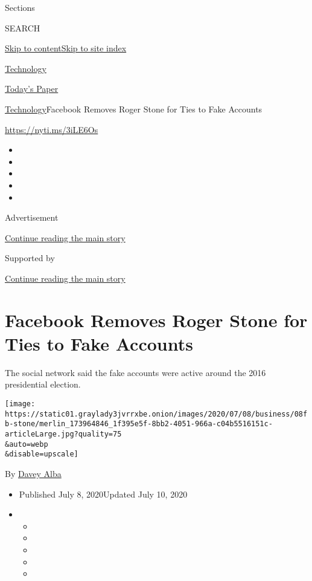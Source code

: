 Sections

SEARCH

\protect\hyperlink{site-content}{Skip to
content}\protect\hyperlink{site-index}{Skip to site index}

\href{https://www.nytimes3xbfgragh.onion/section/technology}{Technology}

\href{https://myaccount.nytimes3xbfgragh.onion/auth/login?response_type=cookie\&client_id=vi}{}

\href{https://www.nytimes3xbfgragh.onion/section/todayspaper}{Today's
Paper}

\href{/section/technology}{Technology}\textbar{}Facebook Removes Roger
Stone for Ties to Fake Accounts

\url{https://nyti.ms/3iLE6Os}

\begin{itemize}
\item
\item
\item
\item
\item
\end{itemize}

Advertisement

\protect\hyperlink{after-top}{Continue reading the main story}

Supported by

\protect\hyperlink{after-sponsor}{Continue reading the main story}

\hypertarget{facebook-removes-roger-stone-for-ties-to-fake-accounts}{%
\section{Facebook Removes Roger Stone for Ties to Fake
Accounts}\label{facebook-removes-roger-stone-for-ties-to-fake-accounts}}

The social network said the fake accounts were active around the 2016
presidential election.

\texttt{[image: https://static01.graylady3jvrrxbe.onion/images/2020/07/08/business/08fb-stone/merlin\_173964846\_1f395e5f-8bb2-4051-966a-c04b5516151c-articleLarge.jpg?quality=75\\\&auto=webp\\\&disable=upscale]}

By \href{https://www.nytimes3xbfgragh.onion/by/davey-alba}{Davey Alba}

\begin{itemize}
\item
  Published July 8, 2020Updated July 10, 2020
\item
  \begin{itemize}
  \item
  \item
  \item
  \item
  \item
  \end{itemize}
\end{itemize}

